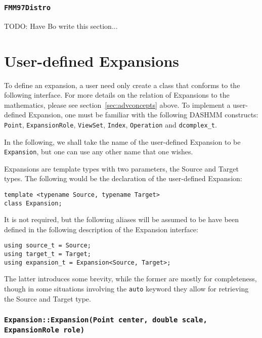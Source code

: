\subsubsection{\texttt{FMM97Distro}}

TODO: Have Bo write this section...



\section{User-defined Expansions}

To define an expansion, a user need only create a class that conforms to the
following interface. For more details on the relation of Expansions to the
mathematics, please see section~\ref{sec:advconcepts} above. To implement a
user-defined Expansion, one must be familiar with the following DASHMM
constructs: \texttt{Point}, \texttt{ExpansionRole}, \texttt{ViewSet},
\texttt{Index}, \texttt{Operation} and \texttt{dcomplex\_t}.

In the following, we shall take the name of the user-defined Expansion to
be \texttt{Expansion}, but one can use any other name that one wishes.

Expansions are template types with two parameters, the Source and Target
types. The following would be the declaration of the user-defined Expansion:

\begin{verbatim}
template <typename Source, typename Target>
class Expansion;
\end{verbatim}

\noindent It is not required, but the following aliases will be assumed to be
have been defined in the following description of the Expansion interface:

\begin{verbatim}
using source_t = Source;
using target_t = Target;
using expansion_t = Expansion<Source, Target>;
\end{verbatim}

\noindent The latter introduces some brevity, while the former are mostly
for completeness, though in some situations involving the \texttt{auto} keyword
they allow for retrieving the Source and Target type.

\subsubsection{\texttt{Expansion::Expansion(Point center, double scale, ExpansionRole role)}}

